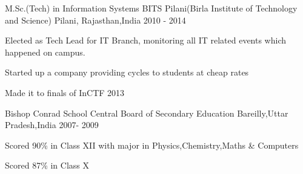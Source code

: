\begin{cventries}
  \cventry
    {M.Sc.(Tech) in Information Systems}
    {BITS Pilani(Birla Institute of Technology and Science)}
    {Pilani, Rajasthan,India}
    {2010 - 2014}
    {
      \begin{cvitems}
        \item {Elected as Tech Lead for IT Branch, monitoring all IT related events which happened on campus.}
        \item{Started up a company providing cycles to students at cheap rates}
        \item{Made it to finals of InCTF 2013}
      \end{cvitems}
    }
  \cventry
    {Bishop Conrad School}
    {Central Board of Secondary Education }
    {Bareilly,Uttar Pradesh,India}
    {2007- 2009}
    {
      \begin{cvitems}
        \item {Scored 90\% in Class XII with major in Physics,Chemistry,Maths \& Computers}
         \item {Scored 87\% in Class X }
      \end{cvitems}
    }  
    
\end{cventries}
